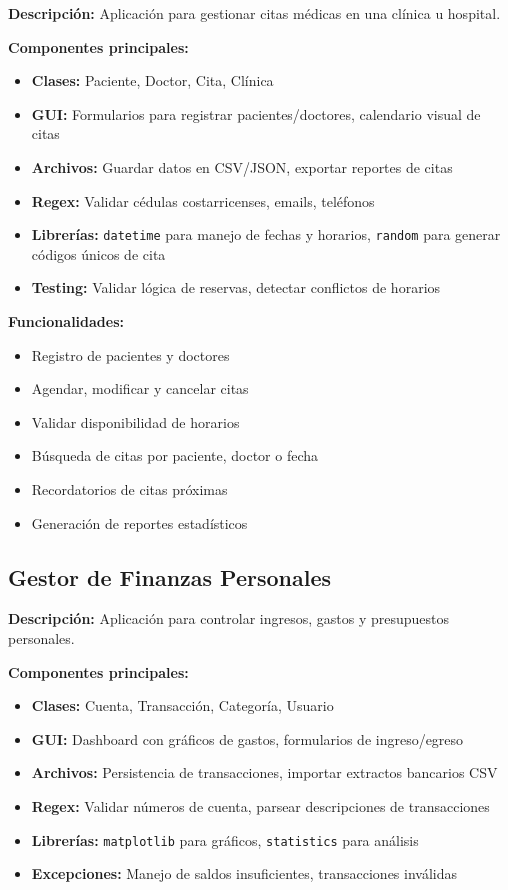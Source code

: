 \documentclass[12pt,a4paper]{article}
\begin{document}
\textbf{Descripción:} Aplicación para gestionar citas médicas en una clínica u hospital.

\vspace{0.5em}
\textbf{Componentes principales:}
\begin{itemize}
    \item \textbf{Clases:} Paciente, Doctor, Cita, Clínica
    \item \textbf{GUI:} Formularios para registrar pacientes/doctores, calendario visual de citas
    \item \textbf{Archivos:} Guardar datos en CSV/JSON, exportar reportes de citas
    \item \textbf{Regex:} Validar cédulas costarricenses, emails, teléfonos
    \item \textbf{Librerías:} \texttt{datetime} para manejo de fechas y horarios, \texttt{random} para generar códigos únicos de cita
    \item \textbf{Testing:} Validar lógica de reservas, detectar conflictos de horarios
\end{itemize}

\vspace{0.5em}
\textbf{Funcionalidades:}
\begin{itemize}
    \item Registro de pacientes y doctores
    \item Agendar, modificar y cancelar citas
    \item Validar disponibilidad de horarios
    \item Búsqueda de citas por paciente, doctor o fecha
    \item Recordatorios de citas próximas
    \item Generación de reportes estadísticos
\end{itemize}

\subsection{Gestor de Finanzas Personales}

\textbf{Descripción:} Aplicación para controlar ingresos, gastos y presupuestos personales.

\vspace{0.5em}
\textbf{Componentes principales:}
\begin{itemize}
    \item \textbf{Clases:} Cuenta, Transacción, Categoría, Usuario
    \item \textbf{GUI:} Dashboard con gráficos de gastos, formularios de ingreso/egreso
    \item \textbf{Archivos:} Persistencia de transacciones, importar extractos bancarios CSV
    \item \textbf{Regex:} Validar números de cuenta, parsear descripciones de transacciones
    \item \textbf{Librerías:} \texttt{matplotlib} para gráficos, \texttt{statistics} para análisis
    \item \textbf{Excepciones:} Manejo de saldos insuficientes, transacciones inválidas
\end{itemize}
\end{document}

